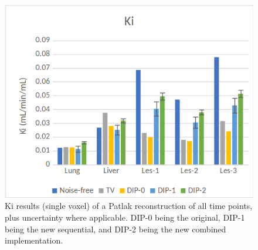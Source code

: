 \documentclass[portrait, color=UCLburgundy, margin=1cm]{uclposter}
\begin{document}
\begin{multicols}{2}
\begin{figure}[H]
                \includegraphics[width=0.9\linewidth]{ki.png}    
                
                \begin{highlightbox}[UCLlightblue]
                    \captionsetup{singlelinecheck=false, justification=centering}
                    \caption{Ki results (single voxel) of a Patlak reconstruction of all time points, plus uncertainty where applicable. \gls{DIP}-0 being the original, \gls{DIP}-1 being the new sequential, and \gls{DIP}-2 being the new combined implementation.}
                \end{highlightbox}
                
                \label{fig:ki}
            \end{figure}
    \end{multicols}
\end{document}
